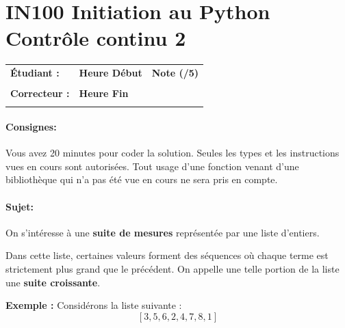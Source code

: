\documentclass[a4paper,11pt]{article}
\begin{document}
\newtheorem{theo}{Theorem}
\newtheorem{coro}{Corollary}[theo]
\newtheorem{lemme}{Lemma}
\renewcommand{\thecoro}{\thetheo.\arabic{coro}}



\parindent=0cm


\section*{\center IN100 Initiation au Python\\
Contrôle continu 2}

\vspace{-0.3 cm}

\begin{table}[h!]
\centering
\renewcommand{\arraystretch}{1.4} %
\begin{tabular}{|p{10cm}|p{3cm}|p{2cm}|}
\hline
\textbf{Étudiant :} & \textbf{Heure Début }  & \textbf{Note (/5) }  \\
& & \\
\hline
\textbf{Correcteur :} & \textbf{Heure Fin } & \\
& & \\
\hline

\hline
\end{tabular}
\end{table}
\vspace{-0.4 cm}
\paragraph*{Consignes:} Vous avez 20 minutes pour coder la solution. Seules les types et les instructions vues en cours sont autorisées. Tout usage d'une fonction 
venant d'une bibliothèque qui n'a pas été vue en cours ne sera pris en compte. 

\vspace{-0.2 cm}
\vspace{-0.2 cm}
\paragraph*{Sujet:}

On s'intéresse à une \textbf{suite de mesures} représentée par une liste d'entiers. 

Dans cette liste, certaines valeurs forment des séquences où chaque terme est strictement plus grand que le précédent.  
On appelle une telle portion de la liste une \textbf{suite croissante}.


\textbf{Exemple :}  
Considérons la liste suivante :
\[
[3, 5, 6, 2, 4, 7, 8, 1]
\]
\end{document}
